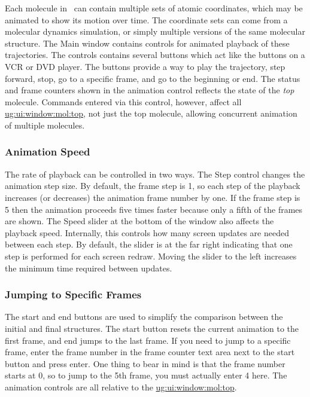 Each molecule in \VMD\ can contain multiple sets of atomic coordinates, 
which may be animated to show its motion over time.  
The coordinate sets can come from a molecular dynamics simulation, 
or simply multiple versions of the same molecular structure.  
The Main window contains controls for animated playback of these trajectories.
The controls contains several buttons which act like the
buttons on a VCR or DVD player.  The buttons provide a way to play
the trajectory, step forward, stop, go to a specific frame, and go to 
the beginning or end.
The status and frame counters shown in the animation control reflects 
the state of the {\em top} molecule.  
Commands entered via this control, however, affect all 
\hyperref{active molecules}{active molecules [\S }{]}{ug:ui:window:mol:top},
not just the top molecule, allowing concurrent animation of multiple molecules. 

\subsubsection{Animation Speed}
The rate of playback can be controlled in two ways.  The
{\sf Step} control changes the animation step size.  By default, the frame
step is 1, so each step of the playback increases (or decreases) the
animation frame number by one.  If the frame step is 5 then the animation
proceeds five times faster because only a fifth of the frames are shown.
The {\sf Speed} slider at the bottom of the window also affects the
playback speed.  Internally, this controls how many screen updates are
needed between each step.  By default, the slider is at the far right
indicating that one step is performed for each screen redraw.  Moving the
slider to the left increases the minimum time required between updates.

\subsubsection{Jumping to Specific Frames}
The start and end buttons are used to simplify the
comparison between the initial and final structures.
The start button resets the current animation to the first frame, 
and end jumps to the last frame.  
If you need to jump to a specific frame, enter the
frame number in the frame counter text area next to the start button and 
press enter.
One thing to bear in mind is that the frame number starts at 0, so to jump
to the 5th frame, you must actually enter 4 here.
The animation controls are all relative to the 
\hyperref{top molecule}{top molecule [\S }{]}{ug:ui:window:mol:top}.

